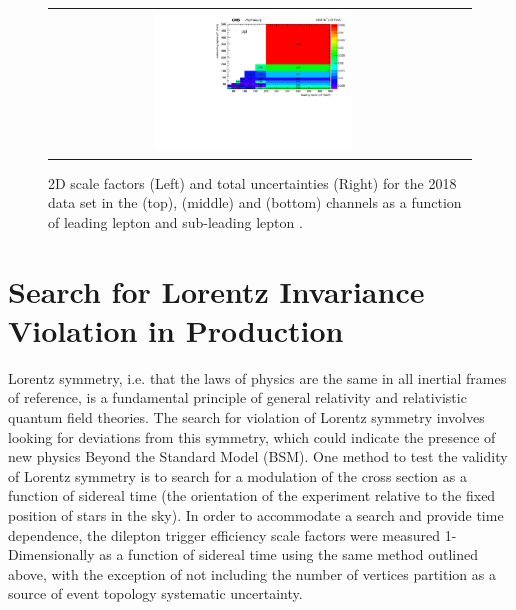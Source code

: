{\begin{figure}[h]
\begin{center}
\begin{tabular}{cc}
      \includegraphics[width=0.50\textwidth]{fig_2018_TrigSF/h2D_lepABpt_mumu_BinErrors.pdf}\\
    \end{tabular}
    \caption{2D scale factors (Left) and total uncertainties (Right) for the 2018 data set in the \emu (top), \ee (middle) and \mumu (bottom) channels as a function of leading lepton \pT and sub-leading lepton \pT.}
    \label{TrigSF_2018_4}
  \end{center}
\end{figure}

\clearpage
\newpage
\section{Search for Lorentz Invariance Violation in \ttbar Production}
Lorentz symmetry, i.e. that the laws of physics are the same in all inertial frames of reference, is a fundamental principle of general relativity and relativistic quantum field theories.
The search for violation of Lorentz symmetry involves looking for deviations from this symmetry, which could indicate the presence of new physics Beyond the Standard Model (BSM).
One method to test the validity of Lorentz symmetry is to search for a modulation of the \ttbar cross section as a function of sidereal time (the orientation of the experiment relative to the fixed position of stars in the sky).
In order to accommodate a search and provide time dependence, the dilepton trigger efficiency scale factors were measured 1-Dimensionally as a function of sidereal time using the same method outlined above, with the exception of not including the number of vertices partition as a source of event topology systematic uncertainty.
}
